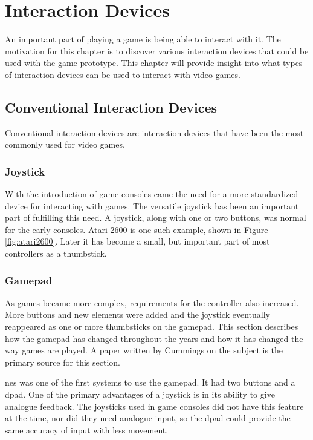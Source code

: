 \chapter{Interaction Devices}
\label{chap:interaction}
An important part of playing a game is being able to interact with it. The motivation for this chapter is to discover various interaction devices that could be used with the game prototype. This chapter will provide insight into what types of interaction devices can be used to interact with video games.


\section{Conventional Interaction Devices}
Conventional interaction devices are interaction devices that have been the most commonly used for video games.

\subsection{Joystick}
With the introduction of game consoles came the need for a more standardized device for interacting with games.
The versatile joystick has been an important part of fulfilling this need.
A joystick, along with one or two buttons, was normal for the early consoles.
Atari 2600 is one such example, shown in Figure \ref{fig:atari2600}.
Later it has become a small, but important part of most controllers as a thumbstick.

\subsection{Gamepad}
As games became more complex, requirements for the controller also increased.
More buttons and new elements were added and the joystick eventually reappeared as one or more thumbsticks on the gamepad.
This section describes how the gamepad has changed throughout the years and how it has changed the way games are played.
A paper written by Cummings \cite{cummings2007evolution} on the subject is the primary source for this section.

\gls{nes} was one of the first systems to use the gamepad.
It had two buttons and a \gls{dpad}.
One of the primary advantages of a joystick is in its ability to give analogue feedback.
The joysticks used in game consoles did not have this feature at the time, nor did they need analogue input, so the \gls{dpad} could provide the same accuracy of input with less movement.

